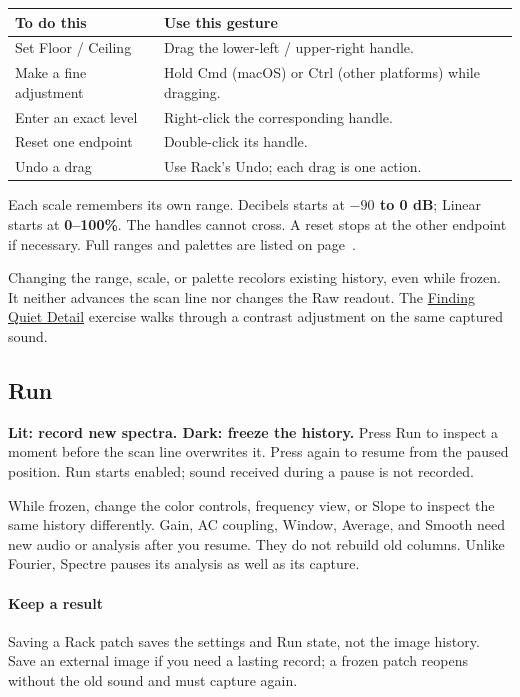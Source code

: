 \clearpage
{}

\begin{center}
\renewcommand{\arraystretch}{1.4}
\begin{tabularx}{\textwidth}{@{}p{}X@{}}
\toprule
\textbf{To do this} & \textbf{Use this gesture} \\
\midrule
Set Floor / Ceiling & Drag the lower-left / upper-right handle. \\
Make a fine adjustment & Hold Cmd (macOS) or Ctrl (other platforms) while dragging. \\
Enter an exact level & Right-click the corresponding handle. \\
Reset one endpoint & Double-click its handle. \\
Undo a drag & Use Rack's Undo; each drag is one action. \\
\bottomrule
\end{tabularx}
\end{center}

Each scale remembers its own range. Decibels starts at \textbf{$-90$ to 0 dB};
Linear starts at \textbf{0--100\%}. The handles cannot cross. A reset stops
at the other endpoint if necessary. Full ranges and palettes are listed on
page~\pageref{sec:control-values}.

Changing the range, scale, or palette recolors existing history, even while
frozen. It neither advances the scan line nor changes the Raw readout.
The \hyperref[sec:detail]{Finding Quiet Detail} exercise walks through a
contrast adjustment on the same captured sound.

\subsection{Run}

\textbf{Lit: record new spectra. Dark: freeze the history.} Press Run to
inspect a moment before the scan line overwrites it. Press again to resume
from the paused position. Run starts enabled; sound received during a pause
is not recorded.

While frozen, change the color controls, frequency view, or Slope to inspect
the same history differently. Gain, AC coupling, Window, Average, and Smooth
need new audio or analysis after you resume. They do not rebuild old columns.
Unlike Fourier, Spectre pauses its analysis as well as its capture.

\paragraph{Keep a result}
Saving a Rack patch saves the settings and Run state, not the image history.
Save an external image if you need a lasting record; a frozen patch reopens
without the old sound and must capture again.

